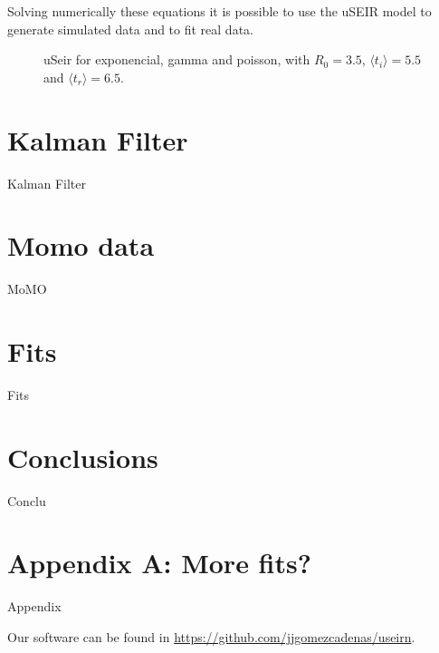 \documentclass[a4paper,oneside,11pt]{article}
\begin{document}
Solving numerically these equations it is possible to use the uSEIR model to generate simulated data and to fit real data. 


\begin{figure}[h!]
  \centering
  \caption{ uSeir for exponencial, gamma and poisson, with $R_0=3.5$, $\langle t_i\rangle=5.5$ and $\langle t_r\rangle=6.5$.  }
  \label{fig:exp}
   \end{figure}
   
 \section{Kalman Filter }
\label{sec:KF}
 Kalman Filter
 
  \section{Momo data }
\label{sec:momo}
MoMO
 
  \section{Fits}
\label{sec:fits}
 Fits

\section{Conclusions}
\label{sec:conclu}

Conclu

\section*{Appendix A: More fits?}
\label{sec:appendix}

Appendix

Our software can be found in  \url{https://github.com/jjgomezcadenas/useirn}. 








\end{document}

